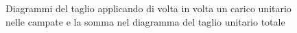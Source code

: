 \begin{figure}[htbp]
\caption{Diagrammi del taglio applicando di volta in volta un carico unitario nelle campate e la somma nel diagramma del taglio unitario totale}
\label{fig:TagliUnitari}
\end{figure}
\clearpage	

